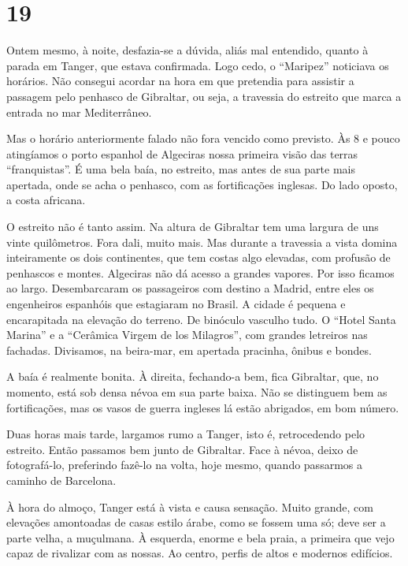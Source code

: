 \section*{19 \adfflatleafright {}}

Ontem mesmo, à noite, desfazia-se a dúvida, aliás mal entendido, quanto à parada em Tanger, que estava confirmada. Logo cedo, o “Maripez” noticiava os horários. Não consegui acordar na hora em que pretendia para assistir a passagem pelo penhasco de Gibraltar, ou seja, a travessia do estreito que marca a entrada no mar Mediterrâneo.

Mas o horário anteriormente falado não fora vencido como previsto. Às 8 e pouco atingíamos o porto espanhol de Algeciras nossa primeira visão das terras “franquistas”. É uma bela baía, no estreito, mas antes de sua parte mais apertada, onde se acha o penhasco, com as fortificações inglesas. Do lado oposto, a costa africana.

O estreito não é tanto assim. Na altura de Gibraltar tem uma largura de uns vinte quilômetros. Fora dali, muito mais. Mas durante a travessia a vista domina inteiramente os dois continentes, que tem costas algo elevadas, com profusão de penhascos e montes. Algeciras não dá acesso a grandes vapores. Por isso ficamos ao largo. Desembarcaram os passageiros com destino a Madrid, entre eles os engenheiros espanhóis que estagiaram no Brasil. A cidade é pequena e encarapitada na elevação do terreno. De binóculo vasculho tudo. O “Hotel Santa Marina” e a “Cerâmica Virgem de los Milagros”, com grandes letreiros nas fachadas. Divisamos, na beira-mar, em apertada pracinha, ônibus e bondes.

A baía é realmente bonita. À direita, fechando-a bem, fica Gibraltar, que, no momento, está sob densa névoa em sua parte baixa. Não se distinguem bem as fortificações, mas os vasos de guerra ingleses lá estão abrigados, em bom número.

Duas horas mais tarde, largamos rumo a Tanger, isto é, retrocedendo pelo estreito. Então passamos bem junto de Gibraltar. Face à névoa, deixo de fotografá-lo, preferindo fazê-lo na volta, hoje mesmo, quando passarmos a caminho de Barcelona.

À hora do almoço, Tanger está à vista e causa sensação. Muito grande, com elevações amontoadas de casas estilo árabe, como se fossem uma só; deve ser a parte velha, a muçulmana. À esquerda, enorme e bela praia, a primeira que vejo capaz de rivalizar com as nossas. Ao centro, perfis de altos e modernos edifícios.

